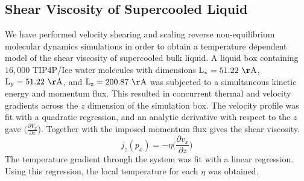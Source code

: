 \subsection{Shear Viscosity of Supercooled Liquid}
We have performed velocity shearing and scaling reverse
non-equilibrium molecular dynamics simulations in order to obtain a
temperature dependent model of the shear viscosity of supercooled bulk
liquid. A liquid box containing $16,000$ TIP4P/Ice water molecules
with dimensions $\mathrm{L_x} = 51.22~\mathrm{\AA}$,
$\mathrm{L_y} = 51.22~\mathrm{\AA}$, and
$\mathrm{L_z}=200.87~\mathrm{\AA}$ was subjected to a simultaneous
kinetic energy and momentum flux. This resulted in concurrent thermal
and velocity gradients across the $z$ dimension of the simulation
box. The velocity profile was fit with a quadratic regression, and an
analytic derivative with respect to the $z$ gave
$(\frac{\partial V_x}{\partial z}$). Together with the imposed
momentum flux gives the shear viscosity.
\begin{equation}\label{eq:viscosity}
  j_{z}(p_{x}) = -\eta \big(\frac{\partial v_{x}}{\partial z}\big)
\end{equation}
The temperature gradient through the system was fit with a linear
regression. Using this regression, the local temperature for each
$\eta$ was obtained.  

